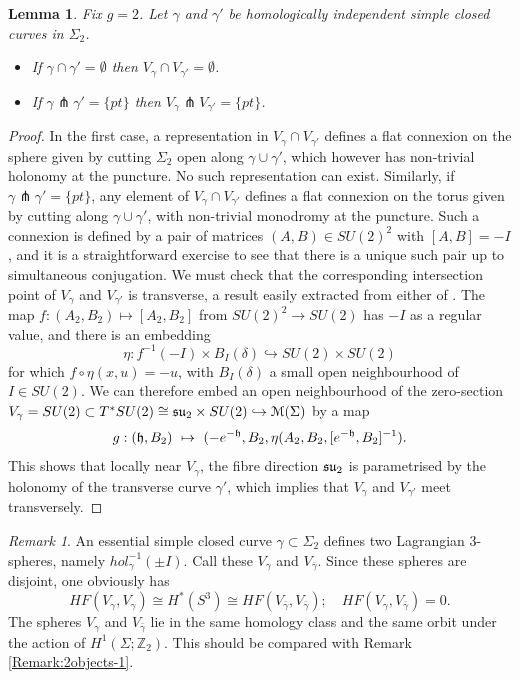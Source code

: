 \documentclass[reqno,10pt]{amsart}
\numberwithin{equation}{section}
\newcommand{\bZ}{{\mathbb Z}}
\newcommand{\scrM}{\EuScript{M}}
\newtheorem{Lemma}[thm]{Lemma}
\theoremstyle{remark}
\newtheorem{Remark}[thm]{Remark}
\begin{document}
\begin{Lemma}\label{Lem:HolonomySpheresMeetRight}
Fix $g=2$.  Let $\gamma$ and $\gamma'$ be homologically independent simple closed curves in $\Sigma_2$. 
\begin{itemize}
\item If $\gamma \cap \gamma' = \emptyset$ then $V_{\gamma} \cap V_{\gamma'} = \emptyset$.  
\item If $\gamma \pitchfork \gamma' = \{pt\}$ then $V_{\gamma} \pitchfork V_{\gamma'} = \{pt\}$.
\end{itemize}
\end{Lemma}

\begin{proof}
In the first case, a representation in $V_{\gamma} \cap V_{\gamma'}$ defines a flat connexion on the sphere given by cutting $\Sigma_2$ open along $\gamma \cup \gamma'$, which however has non-trivial holonomy at the puncture.  No such representation can exist.  Similarly, if $\gamma \pitchfork \gamma' = \{pt\}$, any element of $V_{\gamma} \cap V_{\gamma'}$ defines a flat connexion on the torus given by cutting along $\gamma \cup \gamma'$, with non-trivial monodromy at the puncture. Such a connexion is defined by a pair of matrices $(A,B) \in SU(2)^2$ with $[A,B]=-I$, and it is a straightforward exercise to see that there is a unique such pair up to simultaneous conjugation.  We must check that the corresponding intersection point of $V_{\gamma}$ and $V_{\gamma'}$ is transverse, a result  easily extracted from either of  \cite{Donaldson, Seidel:Notes}.
 The map $f:(A_2,B_2) \mapsto [A_2,B_2]$ from $SU(2)^2 \rightarrow SU(2)$ has $-I$ as a regular value, and there is an embedding
\[
\eta: f^{-1}(-I) \times B_{I}(\delta) \hookrightarrow SU(2) \times SU(2)
\] 
for which $f\circ \eta(x,u) = -u$, with $B_{I}(\delta)$ a small open neighbourhood of $I \in SU(2)$.  We can therefore embed an open neighbourhood of the zero-section $V_{\gamma} = SU(2) \subset T^*SU(2) \cong \frak{su}_2 \times SU(2) \hookrightarrow \scrM(\Sigma)$ by a map
\[
g: (\frak{h}, B_2) \ \mapsto \ (-e^{-\frak{h}}, B_2, \eta(A_2, B_2, [e^{-\frak{h}},B_2]^{-1}).
\]
This shows that locally near $V_{\gamma}$, the fibre direction $\frak{su}_2$ is parametrised by the holonomy of the transverse curve $\gamma'$, which implies that $V_{\gamma}$ and $V_{\gamma'}$ meet transversely. 
 \end{proof}

\begin{Remark} \label{Rem:TwoHolChoices}
An essential simple closed curve $\gamma \subset \Sigma_2$ defines two Lagrangian 3-spheres, namely $hol_{\gamma}^{-1}(\pm I)$. Call these $V_{\gamma}$ and $V_{\bar\gamma}$. Since these spheres are disjoint, one obviously has
\begin{equation} \label{Eqn:TwoHolChoices}
HF(V_{\gamma},V_{\gamma}) \cong H^*(S^3) \cong HF(V_{\bar\gamma},V_{\bar\gamma}); \quad HF(V_{\gamma}, V_{\bar\gamma}) = 0.
\end{equation}
The spheres $V_{\gamma}$ and $V_{\bar\gamma}$ lie in the same homology class and the same orbit under the action of $H^1(\Sigma;\bZ_2)$. This should be compared with Remark \ref{Remark:2objects-1}.
\end{Remark}
\end{document}

